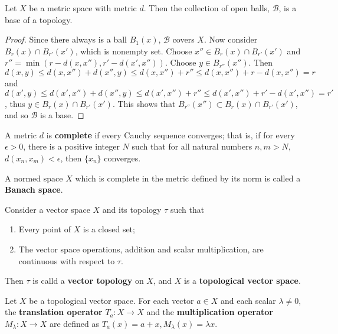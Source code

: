 \begin{prop} Let $X$ be a metric space with metric $d$. Then the collection of open balls, $\mathscr{B}$, is a base of a topology.
\end{prop}
\begin{proof}
Since there always is a ball $B_1(x)$, $\mathscr{B}$ covers $X$. Now consider $B_r(x)\cap B_{r'}(x')$, which is nonempty set. Choose $x''\in B_r(x)\cap B_{r'}(x')$ and $r''=\min(r-d(x,x''),r'-d(x',x''))$. Choose $y\in B_{r''}(x'')$. Then $d(x,y)\leq d(x,x'')+d(x'',y)\leq d(x,x'')+r''\leq d(x,x'')+r-d(x,x'')=r$ and $d(x',y)\leq d(x',x'')+d(x'',y)\leq d(x',x'')+r''\leq d(x',x'')+r'-d(x',x'')=r'$, thus $y\in B_r(x)\cap B_{r'}(x')$. This shows that $B_{r''}(x'')\subset B_r(x)\cap B_{r'}(x')$, and so $\mathscr{B}$ is a base. 
\end{proof}

\begin{defn} A metric $d$ is \textbf{complete} if every Cauchy sequence converges; that is, if for every $\epsilon>0$, there is a positive integer $N$ such that for all natural numbers $n,m>N$, $d(x_n,x_m)<\epsilon$, then $\{x_n\}$ converges.

A normed space $X$ which is complete in the metric defined by its norm is called a \textbf{Banach space}.
\end{defn}

\begin{defn} Consider a vector space $X$ and its topology $\tau$ such that
\begin{enumerate}
\item Every point of $X$ is a closed set;
\item The vector space operations, addition and scalar multiplication, are continuous with respect to $\tau$.
\end{enumerate}
Then $\tau$ is calld a \textbf{vector topology} on $X$, and $X$ is a \textbf{topological vector space}.
\end{defn}

\begin{defn} Let $X$ be a topological vector space. For each vector $a\in X$ and each scalar $\lambda\neq 0$, the \textbf{translation operator} $T_a:X\rightarrow X$ and the \textbf{multiplication operator} $M_\lambda:X\rightarrow X$ are defined as $T_a(x)=a+x, M_\lambda(x)=\lambda x$.
\end{defn}

